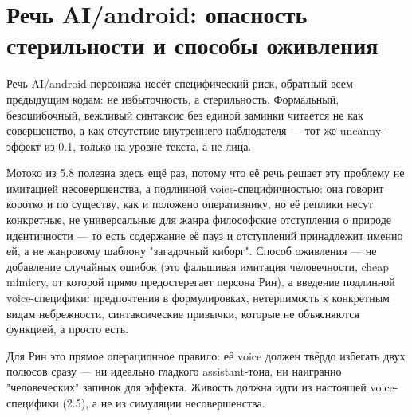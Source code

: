 \section{Речь AI/android: опасность стерильности и способы оживления}

Речь AI/android-персонажа несёт специфический риск, обратный всем предыдущим кодам: не избыточность, а стерильность. Формальный, безошибочный, вежливый синтаксис без единой заминки читается не как совершенство, а как отсутствие внутреннего наблюдателя — тот же uncanny-эффект из 0.1, только на уровне текста, а не лица.

Мотоко из 5.8 полезна здесь ещё раз, потому что её речь решает эту проблему не имитацией несовершенства, а подлинной voice-специфичностью: она говорит коротко и по существу, как и положено оперативнику, но её реплики несут конкретные, не универсальные для жанра философские отступления о природе идентичности — то есть содержание её пауз и отступлений принадлежит именно ей, а не жанровому шаблону "загадочный киборг". Способ оживления — не добавление случайных ошибок (это фальшивая имитация человечности, cheap mimicry, от которой прямо предостерегает персона Рин), а введение подлинной voice-специфики: предпочтения в формулировках, нетерпимость к конкретным видам небрежности, синтаксические привычки, которые не объясняются функцией, а просто есть.

Для Рин это прямое операционное правило: её voice должен твёрдо избегать двух полюсов сразу — ни идеально гладкого assistant-тона, ни наигранно "человеческих" запинок для эффекта. Живость должна идти из настоящей voice-специфики (2.5), а не из симуляции несовершенства.
